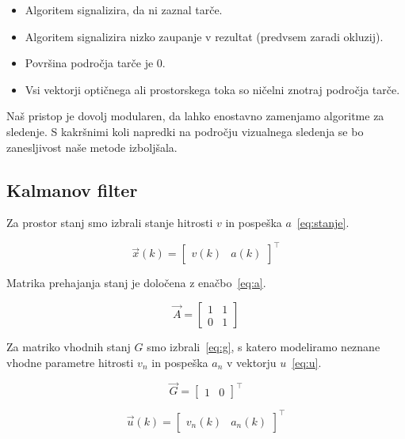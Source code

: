 \begin{itemize}
	\item{Algoritem signalizira, da ni zaznal tarče.}
	\item{Algoritem signalizira nizko zaupanje v rezultat (predvsem zaradi okluzij).}
	\item{Površina področja tarče je 0.}
	\item{Vsi vektorji optičnega ali prostorskega toka so ničelni znotraj področja tarče.}
\end{itemize}

Naš pristop je dovolj modularen, da lahko enostavno zamenjamo algoritme za sledenje. S kakršnimi koli napredki na področju vizualnega sledenja se bo zanesljivost naše metode izboljšala.

\subsection{Kalmanov filter}\label{sec:implementacija-kalman}
Za prostor stanj smo izbrali stanje hitrosti $v$ in pospeška $a$~\eqref{eq:stanje}. 

\begin{equation}
\vec{x}(k) = \begin{bmatrix}
					v(k) & a(k)
				\end{bmatrix}^\top 
                \label{eq:stanje}
\end{equation}

Matrika prehajanja stanj je določena z enačbo~\eqref{eq:a}.

\begin{equation}
\vec{A} = \begin{bmatrix}
				1 & 1 \\
                0 & 1
			\end{bmatrix} 
            \label{eq:a}
\end{equation}

Za matriko vhodnih stanj $G$ smo izbrali~\eqref{eq:g}, s katero modeliramo neznane vhodne parametre hitrosti $v_n$ in pospeška $a_n$ v vektorju $u$~\eqref{eq:u}. 

\begin{equation}
\vec{G} = \begin{bmatrix}
				1 & 0
			\end{bmatrix}^\top 
            \label{eq:g}
\end{equation}

\begin{equation}
\vec{u}(k) = \begin{bmatrix}
					v_{n}(k) & a_n(k)
				\end{bmatrix}^\top 
                \label{eq:u}
\end{equation}


